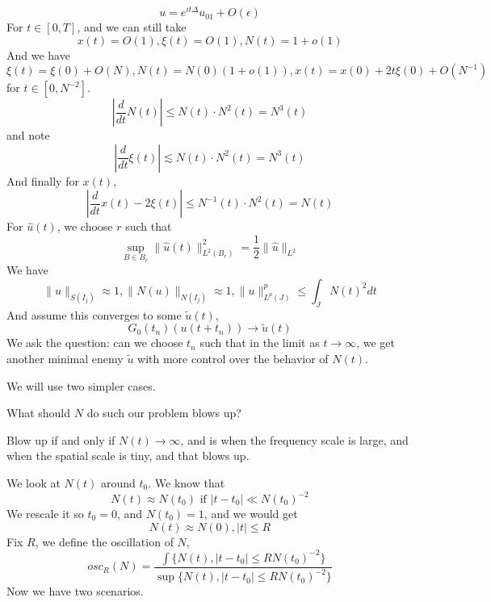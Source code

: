 \begin{equation*}
    u=e^{it\Delta}u_{01}+O(\epsilon)
\end{equation*}
For $t\in [0,T]$, and we can still take
\begin{equation*}
    x(t)=O(1), \xi(t)=O(1), N(t)=1+o(1)
\end{equation*}
And we have
\begin{equation*}
    \xi(t)=\xi(0)+O(N), N(t)=N(0)(1+o(1)), x(t)=x(0)+2t\xi(0)+O(N^{-1})
\end{equation*}
for $t\in [0,N^{-2}]$.
\begin{equation*}
    \left|\frac{d}{dt}N(t)\right|\leq N(t)\cdot N^2(t)=N^3(t)
\end{equation*}
and note 
\begin{equation*}
    \left|\frac{d}{dt}\xi(t)\right|\lesssim N(t)\cdot N^2(t)=N^3(t)
\end{equation*}
And finally for $x(t)$,
\begin{equation*}
    \left|\frac{d}{dt}x(t)-2\xi(t)\right|\leq N^{-1}(t)\cdot N^2(t)=N(t)
\end{equation*}
For $\widehat{u}(t)$, we choose $r$ such that
\begin{equation*}
    \sup_{B\in B_r}\|\widehat{u}(t)\|_{L^2(B_r)}^2=\frac{1}{2}\|\widehat{u}\|_{L^2}
\end{equation*}
We have
\begin{equation*}
    \|u\|_{S(I_j)}\approx 1, \|N(u)\|_{N(I_j)}\approx 1, \|u\|_{L^p(J)}^p\leq\int_JN(t)^2dt
\end{equation*}
And assume this converges to some $\tilde{u}(t)$,
\begin{equation*}
    G_0(t_n)(u(t+t_n))\to \tilde{u}(t)
\end{equation*}
We ask the question: can we choose $t_n$ such that in the limit as $t\to\infty$, we get another minimal enemy $\tilde{u}$ with more control over the behavior of $N(t)$.
\begin{note}
    We will use two simpler cases.
\end{note}
\begin{problem}
    What should $N$ do such our problem blows up?
\end{problem}
Blow up if and only if $N(t)\to\infty$, and is when the frequency scale is large, and when the spatial scale is tiny, and that blows up.

We look at $N(t)$ around $t_0$. We know that 
\begin{equation*}
    N(t)\approx N(t_0) \text{ if } |t-t_0|\ll N(t_0)^{-2}
\end{equation*}
We rescale it so $t_0=0$, and $N(t_0)=1$, and we would get 
\begin{equation*}
    N(t)\approx N(0), |t|\leq R
\end{equation*}
Fix $R$, we define the oscillation of $N$,
\begin{equation*}
    osc_R(N)=\frac{\int\{N(t), |t-t_0|\leq RN(t_0)^{-2}\}}{\sup \{N(t), |t-t_0|\leq RN(t_0)^{-2}\}}
\end{equation*}
Now we have two scenarios.

